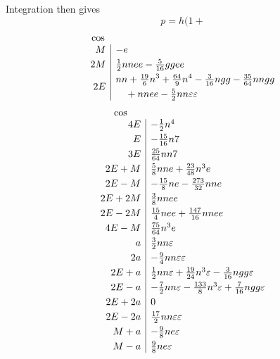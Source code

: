 \noindent Integration then gives
\[
p=h(1+
\]
\[
\begin{array}{r|l}
\multicolumn{1}{c}{\cos}&\\
M&-e\\[3pt]
2M&\tfrac12nnee-\tfrac{5}{16}ggee\\[3pt]
2E&\begin{aligned}
&nn+\tfrac{19}{6}n^3+\tfrac{64}{9}n^4-\tfrac{3}{16}ngg-\tfrac{35}{64}nngg\\
&\quad+nnee-\tfrac52nn\varepsilon\varepsilon
\end{aligned}
\end{array}
\]
\[
\begin{array}{r|l}
\multicolumn{1}{c}{\cos}&\\
4E&-\tfrac12n^4\\[3pt]
E&-\tfrac{15}{16}n7\\[3pt]
3E&\tfrac{25}{64}nn7\\[3pt]
2E+M&\tfrac58nne+\tfrac{23}{48}n^3e\\[3pt]
2E-M&-\tfrac{15}{8}ne-\tfrac{273}{32}nne\\[3pt]
2E+2M&\tfrac38nnee\\[3pt]
2E-2M&\tfrac{15}{4}nee+\tfrac{147}{16}nnee\\[3pt]
4E-M&\tfrac{75}{64}n^3e\\[3pt]
a&\tfrac32nn\varepsilon\\[3pt]
2a&-\tfrac94nn\varepsilon\varepsilon\\[3pt]
2E+a&\tfrac12nn\varepsilon+\tfrac{19}{24}n^3\varepsilon-\tfrac{3}{16}ngg\varepsilon\\[3pt]
2E-a&-\tfrac72nn\varepsilon-\tfrac{133}{8}n^3\varepsilon+\tfrac{7}{16}ngg\varepsilon\\[3pt]
2E+2a&0\\[3pt]
2E-2a&\tfrac{17}{2}nn\varepsilon\varepsilon\\[3pt]
M+a&-\tfrac98ne\varepsilon\\[3pt]
M-a&\tfrac98ne\varepsilon
\end{array}
\]
